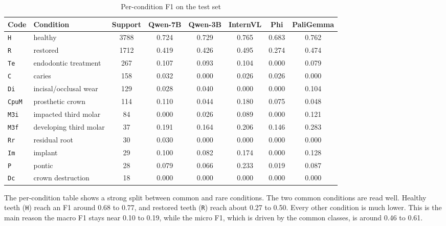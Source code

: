 \documentclass[a4paper,12pt]{report}
\begin{document}
\begin{table}[H]
\centering
\caption{Per-condition F1 on the test set}
\label{tab:results-percond}
\small
\begin{adjustbox}{max width=\textwidth}
\begin{tabular}{llcccccc}
\toprule
Code & Condition & Support & Qwen-7B & Qwen-3B & InternVL & Phi & PaliGemma \\
\midrule
\texttt{H}    & healthy                & 3788 & 0.724 & 0.729 & 0.765 & 0.683 & 0.762 \\
\texttt{R}    & restored               & 1712 & 0.419 & 0.426 & 0.495 & 0.274 & 0.474 \\
\texttt{Te}   & endodontic treatment   & 267  & 0.107 & 0.093 & 0.104 & 0.000 & 0.079 \\
\texttt{C}    & caries                 & 158  & 0.032 & 0.000 & 0.026 & 0.026 & 0.000 \\
\texttt{Di}   & incisal/occlusal wear  & 129  & 0.028 & 0.040 & 0.000 & 0.000 & 0.104 \\
\texttt{CpuM} & prosthetic crown       & 114  & 0.110 & 0.044 & 0.180 & 0.075 & 0.048 \\
\texttt{M3i}  & impacted third molar   & 84   & 0.000 & 0.026 & 0.089 & 0.000 & 0.121 \\
\texttt{M3f}  & developing third molar & 37   & 0.191 & 0.164 & 0.206 & 0.146 & 0.283 \\
\texttt{Rr}   & residual root          & 30   & 0.030 & 0.000 & 0.000 & 0.000 & 0.000 \\
\texttt{Im}   & implant                & 29   & 0.100 & 0.082 & 0.174 & 0.000 & 0.128 \\
\texttt{P}    & pontic                 & 28   & 0.079 & 0.066 & 0.233 & 0.019 & 0.087 \\
\texttt{Dc}   & crown destruction      & 18   & 0.000 & 0.000 & 0.000 & 0.000 & 0.000 \\
\bottomrule
\end{tabular}
\end{adjustbox}
\end{table}

The per-condition table shows a strong split between common and rare conditions. The two common conditions are read well. Healthy teeth (\texttt{H}) reach an F1 around 0.68 to 0.77, and restored teeth (\texttt{R}) reach about 0.27 to 0.50. Every other condition is much lower. This is the main reason the macro F1 stays near 0.10 to 0.19, while the micro F1, which is driven by the common classes, is around 0.46 to 0.61.
\end{document}
